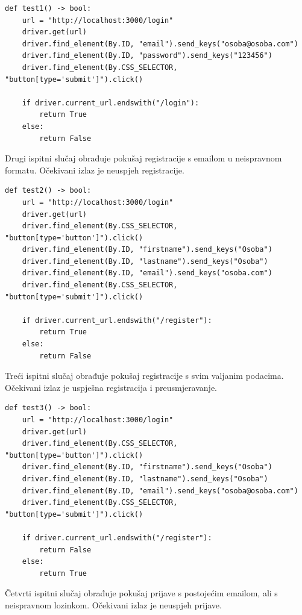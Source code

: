 \lstset{language=Python, xleftmargin=0pt}
\begin{lstlisting}
def test1() -> bool:
    url = "http://localhost:3000/login"
    driver.get(url)
    driver.find_element(By.ID, "email").send_keys("osoba@osoba.com")
    driver.find_element(By.ID, "password").send_keys("123456")
    driver.find_element(By.CSS_SELECTOR, "button[type='submit']").click()

    if driver.current_url.endswith("/login"):
        return True
    else:
        return False
\end{lstlisting}

Drugi ispitni slučaj obrađuje pokušaj registracije s emailom u neispravnom formatu. Očekivani izlaz je neuspjeh registracije.

\lstset{language=Python, xleftmargin=0pt}
\begin{lstlisting}
def test2() -> bool:
    url = "http://localhost:3000/login"
    driver.get(url)
    driver.find_element(By.CSS_SELECTOR, "button[type='button']").click()
    driver.find_element(By.ID, "firstname").send_keys("Osoba")
    driver.find_element(By.ID, "lastname").send_keys("Osoba")
    driver.find_element(By.ID, "email").send_keys("osoba.com")
    driver.find_element(By.CSS_SELECTOR, "button[type='submit']").click()

    if driver.current_url.endswith("/register"):
        return True
    else:
        return False
\end{lstlisting}

Treći ispitni slučaj obrađuje pokušaj registracije s svim valjanim podacima. Očekivani izlaz je uspješna registracija i preusmjeravanje.

\lstset{language=Python, xleftmargin=0pt}
\begin{lstlisting}
def test3() -> bool:
    url = "http://localhost:3000/login"
    driver.get(url)
    driver.find_element(By.CSS_SELECTOR, "button[type='button']").click()
    driver.find_element(By.ID, "firstname").send_keys("Osoba")
    driver.find_element(By.ID, "lastname").send_keys("Osoba")
    driver.find_element(By.ID, "email").send_keys("osoba@osoba.com")
    driver.find_element(By.CSS_SELECTOR, "button[type='submit']").click()

    if driver.current_url.endswith("/register"):
        return False
    else:
        return True
\end{lstlisting}

Četvrti ispitni slučaj obrađuje pokušaj prijave s postojećim emailom, ali s neispravnom lozinkom. Očekivani izlaz je neuspjeh prijave.

